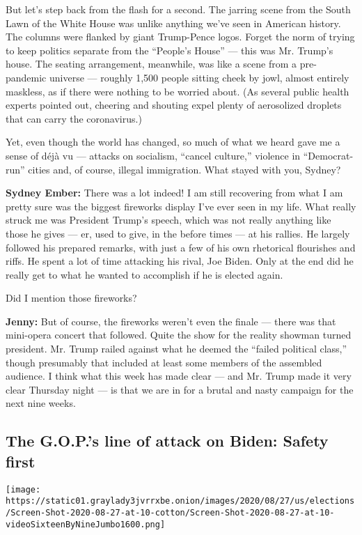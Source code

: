But let's step back from the flash for a second. The jarring scene from
the South Lawn of the White House was unlike anything we've seen in
American history. The columns were flanked by giant Trump-Pence logos.
Forget the norm of trying to keep politics separate from the ``People's
House'' --- this was Mr. Trump's house. The seating arrangement,
meanwhile, was like a scene from a pre-pandemic universe --- roughly
1,500 people sitting cheek by jowl, almost entirely maskless, as if
there were nothing to be worried about. (As several public health
experts pointed out, cheering and shouting expel plenty of aerosolized
droplets that can carry the coronavirus.)

Yet, even though the world has changed, so much of what we heard gave me
a sense of déjà vu --- attacks on socialism, ``cancel culture,''
violence in ``Democrat-run'' cities and, of course, illegal immigration.
What stayed with you, Sydney?

\textbf{Sydney Ember:} There was a lot indeed! I am still recovering
from what I am pretty sure was the biggest fireworks display I've ever
seen in my life. What really struck me was President Trump's speech,
which was not really anything like those he gives --- er, used to give,
in the before times --- at his rallies. He largely followed his prepared
remarks, with just a few of his own rhetorical flourishes and riffs. He
spent a lot of time attacking his rival, Joe Biden. Only at the end did
he really get to what he wanted to accomplish if he is elected again.

Did I mention those fireworks?

\textbf{Jenny:} But of course, the fireworks weren't even the finale ---
there was that mini-opera concert that followed. Quite the show for the
reality showman turned president. Mr. Trump railed against what he
deemed the ``failed political class,'' though presumably that included
at least some members of the assembled audience. I think what this week
has made clear --- and Mr. Trump made it very clear Thursday night ---
is that we are in for a brutal and nasty campaign for the next nine
weeks.

\hypertarget{the-gops-line-of-attack-on-biden-safety-first}{%
\subsection{The G.O.P.'s line of attack on Biden: Safety
first}\label{the-gops-line-of-attack-on-biden-safety-first}}

\texttt{[image: https://static01.graylady3jvrrxbe.onion/images/2020/08/27/us/elections/Screen-Shot-2020-08-27-at-10-cotton/Screen-Shot-2020-08-27-at-10-videoSixteenByNineJumbo1600.png]}

